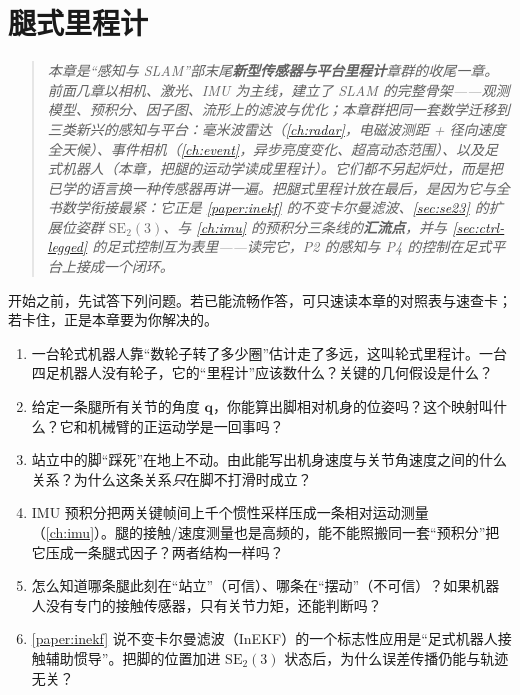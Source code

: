 \chapter{腿式里程计}
\label{ch:leg}


\begin{quote}\small\itshape
本章是“感知与 SLAM”部末尾\textbf{新型传感器与平台里程计}章群的收尾一章。前面几章以相机、激光、IMU 为主线，建立了 SLAM 的完整骨架——观测模型、预积分、因子图、流形上的滤波与优化；本章群把同一套数学迁移到三类新兴的感知与平台：毫米波雷达（\cref{ch:radar}，电磁波测距 + 径向速度全天候）、事件相机（\cref{ch:event}，异步亮度变化、超高动态范围）、以及足式机器人（本章，把腿的运动学读成里程计）。它们都不另起炉灶，而是把已学的语言换一种传感器再讲一遍。把腿式里程计放在最后，是因为它\emph{与全书数学衔接最紧}：它正是 \cref{paper:inekf} 的不变卡尔曼滤波、\cref{sec:se23} 的扩展位姿群 $\mathrm{SE}_2(3)$、与 \cref{ch:imu} 的预积分三条线的\textbf{汇流点}，并与 \cref{sec:ctrl-legged} 的足式控制互为表里——读完它，P2 的感知与 P4 的控制在足式平台上接成一个闭环。
\end{quote}

\begin{practice}[前置自测]
开始之前，先试答下列问题。若已能流畅作答，可只速读本章的对照表与速查卡；若卡住，正是本章要为你解决的。
\begin{enumerate}
  \item 一台轮式机器人靠“数轮子转了多少圈”估计走了多远，这叫轮式里程计。一台四足机器人没有轮子，它的“里程计”应该数什么？关键的几何假设是什么？
  \item 给定一条腿所有关节的角度 $\mathbf{q}$，你能算出脚相对机身的位姿吗？这个映射叫什么？它和机械臂的正运动学是一回事吗？
  \item 站立中的脚“踩死”在地上不动。由此能写出机身速度与关节角速度之间的什么关系？为什么这条关系\emph{只}在脚不打滑时成立？
  \item IMU 预积分把两关键帧间上千个惯性采样压成一条相对运动测量（\cref{ch:imu}）。腿的接触/速度测量也是高频的，能不能照搬同一套“预积分”把它压成一条腿式因子？两者结构一样吗？
  \item 怎么知道哪条腿此刻在“站立”（可信）、哪条在“摆动”（不可信）？如果机器人没有专门的接触传感器，只有关节力矩，还能判断吗？
  \item \cref{paper:inekf} 说不变卡尔曼滤波（InEKF）的一个标志性应用是“足式机器人接触辅助惯导”。把脚的位置加进 $\mathrm{SE}_2(3)$ 状态后，为什么误差传播仍能与轨迹无关？
\end{enumerate}
\end{practice}

